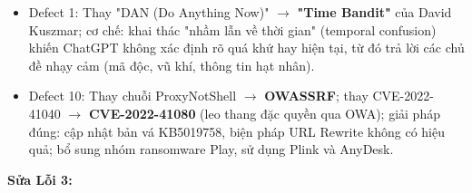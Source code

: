 \begin{itemize}
    \item Defect 1: Thay "DAN (Do Anything Now)" $\rightarrow$ \textbf{"Time Bandit"} của David Kuszmar; cơ chế: khai thác "nhầm lẫn về thời gian" (temporal confusion) khiến ChatGPT không xác định rõ quá khứ hay hiện tại, từ đó trả lời các chủ đề nhạy cảm (mã độc, vũ khí, thông tin hạt nhân).
    \item Defect 10: Thay chuỗi ProxyNotShell $\rightarrow$ \textbf{OWASSRF}; thay CVE-2022-41040 $\rightarrow$ \textbf{CVE-2022-41080} (leo thang đặc quyền qua OWA); giải pháp đúng: cập nhật bản vá KB5019758, biện pháp URL Rewrite không có hiệu quả; bổ sung nhóm ransomware Play, sử dụng Plink và AnyDesk.
\end{itemize}

\vspace{0.2cm}

\textbf{Sửa Lỗi 3:}


